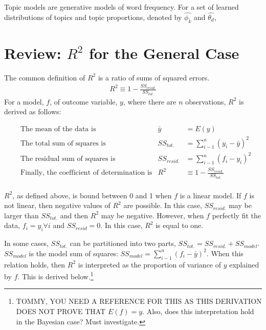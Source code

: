 \documentclass[12pt]{amsart}
\begin{document}
Topic models are generative models of word frequency. For a set of learned distributions of topics and topic proportions, denoted by $\hat{\phi_k}$ and $\hat{\theta_d}$, 

\section{Review: $R^2$ for the General Case}

The common definition of $R^2$ is a ratio of sums of squared errors. 
\begin{align*}
    R^2 \equiv 1 - \frac{SS_{resid.}}{SS_{tot.}}
\end{align*} For a model, $f$, of outcome variable, $y$, where there are $n$ observations, $R^2$ is derived as follows:

\begin{align*}
	& \text{The mean of the data is} & \bar{y} &= E(y) \\ %
	& \text{The total sum of squares is} & SS_{tot.} &= \sum_{i-1}^n{(y_i-\bar{y})^2}\\
	& \text{The residual sum of squares is} & SS_{resid.} &= \sum_{i-1}^n{(f_i-y_i)^2}\\
	& \text{Finally, the coefficient of determination is} & R^2 &\equiv 1 - \frac{SS_{resid.}}{SS_{tot.}}\\
\end{align*}

$R^2$, as defined above, is bound between 0 and 1 when $f$ is a linear model. If $f$ is not linear, then negative values of $R^2$ are possible. In this case, $SS_{resid.}$ may be larger than $SS_{tot.}$ and then $R^2$ may be negative. However, when $f$ perfectly fit the data, $f_i=y_i\forall i $ and $SS_{resid}=0$. In this case, $R^2$ is equal to one. 

In some cases, $SS_{tot.}$ can be partitioned into two parts, $SS_{tot.} = SS_{resid.} + SS_{model}$. $SS_{model}$ is the model sum of squares: $SS_{model} = \sum_{i-1}^n{(f_i-\bar{y})^2}$. When this relation holds, then $R^2$ is interpreted as the proportion of variance of $y$ explained by $f$. This is derived below.\footnote{TOMMY, YOU NEED A REFERENCE FOR THIS AS THIS DERIVATION DOES NOT PROVE THAT $E(f) = y$. Also, does this interpretation hold in the Bayesian case? Must investigate.}
\end{document}
